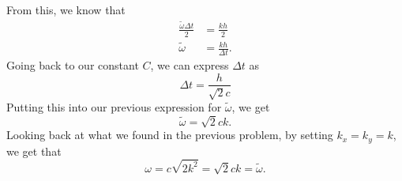 \documentclass[12pt]{scrartcl}
\begin{document}
From this, we know that
\begin{align*}
    \frac{\tilde{\omega}\Delta t}{2}&=\frac{kh}{2}\\
    \tilde{\omega}&=\frac{kh}{\Delta t}.
\end{align*}
Going back to our constant $C$, we can express $\Delta t$ as 
\begin{equation*}
    \Delta t = \frac{h}{\sqrt{2}c}
\end{equation*}
Putting this into our previous expression for $\tilde{\omega}$, we get
\begin{equation*}
    \tilde{\omega}=\sqrt{2}ck.
\end{equation*}
Looking back at what we found in the previous problem, by setting $k_x = k_y = k$, we get that 
\begin{equation*}
    \omega=c\sqrt{2k^2}=\sqrt{2}ck = \tilde{\omega}.
\end{equation*}
\end{document}
